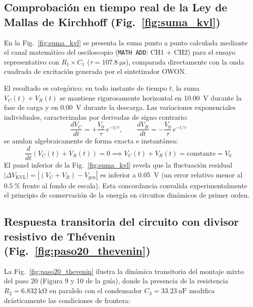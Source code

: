 \subsection{Comprobación en tiempo real de la Ley de Mallas de Kirchhoff (Fig.~\ref{fig:suma_kvl})}

En la Fig.~\ref{fig:suma_kvl} se presenta la suma punto a punto calculada mediante el canal matemático del osciloscopio (\texttt{MATH ADD}: CH1 + CH2) para el ensayo representativo con $R_1 \times C_1$ ($\tau = \qty{107,8}{\micro\second}$), comparada directamente con la onda cuadrada de excitación generada por el sintetizador OWON.

El resultado es categórico: en todo instante de tiempo $t$, la suma $V_C(t) + V_R(t)$ se mantiene rigurosamente horizontal en \qty{10,00}{\volt} durante la fase de carga y en \qty{0,00}{\volt} durante la descarga. Las variaciones exponenciales individuales, caracterizadas por derivadas de signo contrario:
\begin{equation*}
    \frac{dV_C}{dt} = +\frac{V_0}{\tau}\,e^{-t/\tau}, \qquad \frac{dV_R}{dt} = -\frac{V_0}{\tau}\,e^{-t/\tau}
\end{equation*}
se anulan algebraicamente de forma exacta e instantánea:
\begin{equation*}
    \frac{d}{dt}\left(V_C(t) + V_R(t)\right) = 0 \implies V_C(t) + V_R(t) = \text{constante} = V_0
\end{equation*}
El panel inferior de la Fig.~\ref{fig:suma_kvl} revela que la fluctuación residual $|\Delta V_{\text{KVL}}| = |(V_C + V_R) - V_{\text{gen}}|$ es inferior a \qty{0,05}{\volt} (un error relativo menor al $\qty{0,5}{\percent}$ frente al fondo de escala). Esta concordancia convalida experimentalmente el principio de conservación de la energía en circuitos dinámicos de primer orden.

\subsection{Respuesta transitoria del circuito con divisor resistivo de Thévenin (Fig.~\ref{fig:paso20_thevenin})}

La Fig.~\ref{fig:paso20_thevenin} ilustra la dinámica transitoria del montaje mixto del paso 20 (Figura 9 y 10 de la guía), donde la presencia de la resistencia $R_2 = \qty{6,832}{\kilo\ohm}$ en paralelo con el condensador $C_3 = \qty{33,23}{\nano\farad}$ modifica drásticamente las condiciones de frontera:

